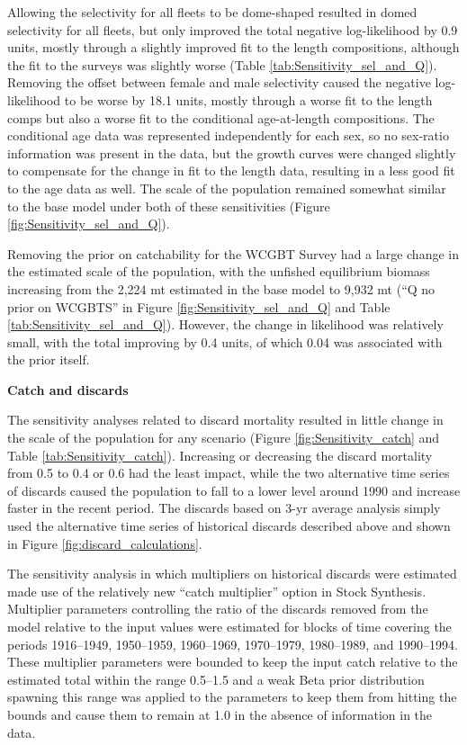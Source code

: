 \documentclass[12pt,]{article}
\begin{document}
Allowing the selectivity for all fleets to be dome-shaped resulted in
domed selectivity for all fleets, but only improved the total negative
log-likelihood by 0.9 units, mostly through a slightly improved fit to
the length compositions, although the fit to the surveys was slightly
worse (Table \ref{tab:Sensitivity_sel_and_Q}). Removing the offset
between female and male selectivity caused the negative log-likelihood
to be worse by 18.1 units, mostly through a worse fit to the length
comps but also a worse fit to the conditional age-at-length
compositions. The conditional age data was represented independently for
each sex, so no sex-ratio information was present in the data, but the
growth curves were changed slightly to compensate for the change in fit
to the length data, resulting in a less good fit to the age data as
well. The scale of the population remained somewhat similar to the base
model under both of these sensitivities (Figure
\ref{fig:Sensitivity_sel_and_Q}).

Removing the prior on catchability for the WCGBT Survey had a large
change in the estimated scale of the population, with the unfished
equilibrium biomass increasing from the 2,224 mt estimated in the base
model to 9,932 mt (``Q no prior on WCGBTS'' in Figure
\ref{fig:Sensitivity_sel_and_Q} and Table
\ref{tab:Sensitivity_sel_and_Q}). However, the change in likelihood was
relatively small, with the total improving by 0.4 units, of which 0.04
was associated with the prior itself.

\textbf{Catch and discards}

The sensitivity analyses related to discard mortality resulted in little
change in the scale of the population for any scenario (Figure
\ref{fig:Sensitivity_catch} and Table \ref{tab:Sensitivity_catch}).
Increasing or decreasing the discard mortality from 0.5 to 0.4 or 0.6
had the least impact, while the two alternative time series of discards
caused the population to fall to a lower level around 1990 and increase
faster in the recent period. The discards based on 3-yr average analysis
simply used the alternative time series of historical discards described
above and shown in Figure \ref{fig:discard_calculations}.

The sensitivity analysis in which multipliers on historical discards
were estimated made use of the relatively new ``catch multiplier''
option in Stock Synthesis. Multiplier parameters controlling the ratio
of the discards removed from the model relative to the input values were
estimated for blocks of time covering the periods 1916--1949,
1950--1959, 1960--1969, 1970--1979, 1980--1989, and 1990--1994. These
multiplier parameters were bounded to keep the input catch relative to
the estimated total within the range 0.5--1.5 and a weak Beta prior
distribution spawning this range was applied to the parameters to keep
them from hitting the bounds and cause them to remain at 1.0 in the
absence of information in the data.
\end{document}
